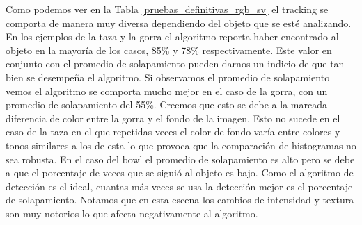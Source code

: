 Como podemos ver en la Tabla \ref{pruebas_definitivas_rgb_sv} el tracking se comporta de manera muy diversa dependiendo del objeto que se esté analizando. En los ejemplos de la taza y la gorra el algoritmo reporta haber encontrado al objeto en la mayoría de los casos, 85\% y 78\% respectivamente. Este valor en conjunto con el promedio de solapamiento pueden darnos un indicio de que tan bien se desempeña el algoritmo. Si observamos el promedio de solapamiento vemos el algoritmo se comporta mucho mejor en el caso de la gorra, con un promedio de solapamiento del 55\%. Creemos que esto se debe a la marcada diferencia de color entre la gorra y el fondo de la imagen. Esto no sucede en el caso de la taza en el que repetidas veces el color de fondo varía entre colores y tonos similares a los de esta lo que provoca que la comparación de histogramas no sea robusta. En el caso del bowl el promedio de solapamiento es alto pero se debe a que el porcentaje de veces que se siguió al objeto es bajo. Como el algoritmo de detección es el ideal, cuantas más veces se usa la detección mejor es el porcentaje de solapamiento. Notamos que en esta escena los cambios de intensidad y textura son muy notorios lo que afecta negativamente al algoritmo.


